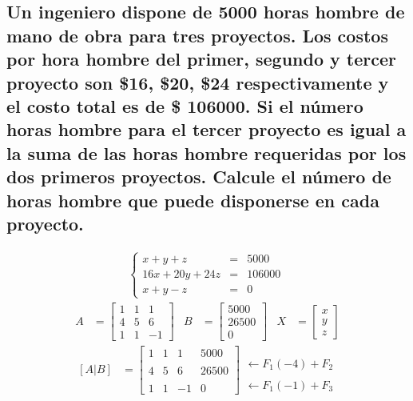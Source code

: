 \documentclass[10pt, a4paper]{article}
\begin{document}
\subsection{Un ingeniero dispone de 5000 horas hombre de mano de obra para tres proyectos. Los costos por hora hombre del primer, segundo y tercer proyecto son \$16, \$20, \$24 respectivamente y el costo total es de \$ 106000. Si el número horas hombre para el tercer proyecto es igual a la suma de las horas hombre requeridas por los dos primeros proyectos. Calcule el número de horas hombre que puede disponerse en cada proyecto.}
  \begin{align*}
    \left\{
    \begin{array}{rcl}
      x+y+z &= &5000\\
      16x+20y+24z &= &106000\\
      x+y-z &= &0
    \end{array}
    \right.\
  \end{align*}
  \begin{align*}
    A &= \begin{bmatrix}
      1 & 1 & 1\\
      4 & 5 & 6\\
      1 & 1 & -1
    \end{bmatrix}&
    B &= \begin{bmatrix}
      5000\\
      26500\\
      0
    \end{bmatrix}&
    X &= \begin{bmatrix}
      x\\
      y\\
      z
    \end{bmatrix}
  \end{align*}
  \begin{align*}
    \left[A|B\right]&=\left[
      \begin{array}{ccc|c}
        1 & 1 & 1 & 5000 \\\\
        4 & 5 & 6 & 26500 \\\\
        1 & 1 & -1 & 0
      \end{array}
    \right]
    \begin{array}{r}
      \\\\
      \leftarrow F_1\left(-4\right)+F_2\\\\
      \leftarrow F_1\left(-1\right)+F_3
    \end{array}
  \end{align*}
\end{document}
